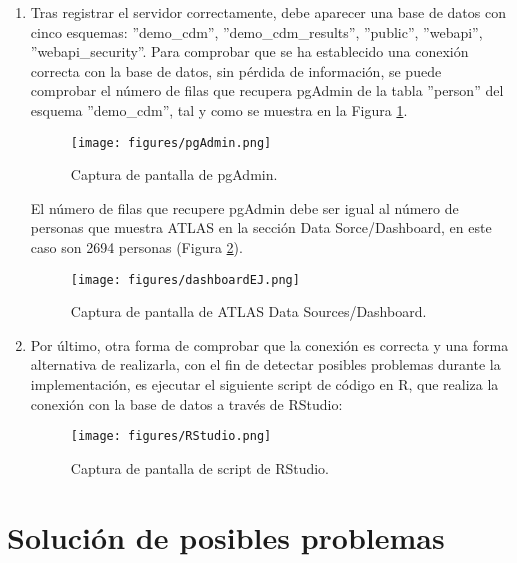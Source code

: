 \begin{enumerate}
    \begin{lstlisting}[language=sh]
        host = 127.0.0.1
        port = 5432
        user = postgres
        password = mypass
    \end{lstlisting}
    
    \item Tras registrar el servidor correctamente, debe aparecer una base de datos con cinco esquemas: ''demo\_cdm'', ''demo\_cdm\_results'', ''public'', ''webapi'', ''webapi\_security''. Para comprobar que se ha establecido una conexión correcta con la base de datos, sin pérdida de información, se puede comprobar el número de filas que recupera pgAdmin de la tabla ''person'' del esquema ''demo\_cdm'', tal y como se muestra en la Figura \ref{fig:pgAdmin}.

    \begin{figure}[H]
    \centering
    \texttt{[image: figures/pgAdmin.png]}
     \caption{Captura de pantalla de pgAdmin.}
    \label{fig:pgAdmin}
    \end{figure}

    El número de filas que recupere pgAdmin debe ser igual al número de personas que muestra ATLAS en la sección Data Sorce/Dashboard, en este caso son 2694 personas (Figura \ref{fig:dashboardEJ}).

    \begin{figure}[H]
    \centering
    \texttt{[image: figures/dashboardEJ.png]}
     \caption{Captura de pantalla de ATLAS Data Sources/Dashboard.}
    \label{fig:dashboardEJ}
    \end{figure}

    \item Por último, otra forma de comprobar que la conexión es correcta y una forma alternativa de realizarla, con el fin de detectar posibles problemas durante la implementación, es ejecutar el siguiente script de código en R, que realiza la conexión con la base de datos a través de RStudio:

    \begin{figure}[H]
    \centering
    \texttt{[image: figures/RStudio.png]}
     \caption{Captura de pantalla de script de RStudio.}
    \label{fig:RStudio}
    \end{figure}
    
\end{enumerate}

\section{Solución de posibles problemas}

